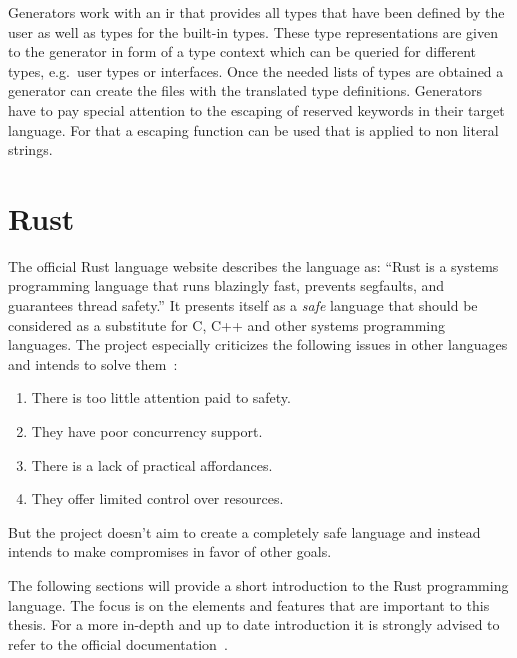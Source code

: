 \documentclass[thesis]{subfiles}
\begin{document}
    Generators work with an \gls{ir} that provides all types that have been defined by the user as well as types for the built-in types.
    These type representations are given to the generator in form of a type context which can be queried for different types, e.g.~user types or interfaces.
    Once the needed lists of types are obtained a generator can create the files with the translated type definitions.
    Generators have to pay special attention to the escaping of reserved keywords in their target language.
    For that a escaping function can be used that is applied to non literal strings.

\section{Rust}\label{sec:rust}
  The official Rust language website describes the language as:
  \enquote{Rust is a systems programming language that runs blazingly fast, prevents segfaults, and guarantees thread safety.}\autocite{rust-org}
  It presents itself as a \emph{safe} language that should be considered as a substitute for C, C++ and other systems programming languages.
  The project especially criticizes the following issues in other languages and intends to solve them~\autocite{rust-faq}:
  \begin{enumerate}
    \item There is too little attention paid to safety.
    \item They have poor concurrency support.
    \item There is a lack of practical affordances.
    \item They offer limited control over resources.
  \end{enumerate}
  But the project doesn't aim to create a completely safe language and instead intends to make compromises in favor of other goals.%
  ~\autocite{rust-faq}

  The following sections will provide a short introduction to the Rust programming language.
  The focus is on the elements and features that are important to this thesis.
  For a more in-depth and up to date introduction it is strongly advised to refer to the official documentation~\autocites{rust-org}{rust-book}{rust-doc}{rust-nom}.
\end{document}
